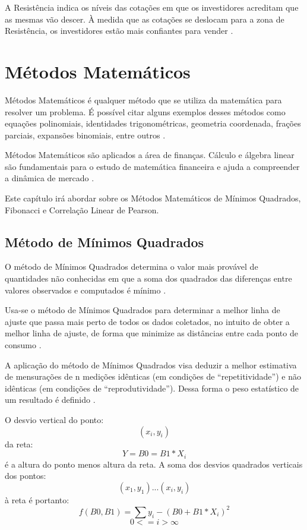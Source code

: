 A Resistência indica os níveis das cotações em que os investidores acreditam que as mesmas vão descer. À medida que as cotações se deslocam para a zona de Resistência, os investidores estão mais confiantes para vender \cite{collins2012}.

\section{Métodos Matemáticos}

Métodos Matemáticos é qualquer método que se utiliza da matemática para resolver um problema. É possível citar alguns exemplos desses métodos como equações polinomiais, identidades trigonométricas, geometria coordenada, frações parciais, expansões binomiais, entre outros \cite{riley2011}.

Métodos Matemáticos são aplicados a área de finanças. Cálculo e álgebra linear são fundamentais para o estudo de matemática financeira e ajuda a compreender a dinâmica de mercado \cite{konis2014}.

Este capítulo irá abordar sobre os Métodos Matemáticos de Mínimos Quadrados, Fibonacci e Correlação Linear de Pearson.

\subsection{Método de Mínimos Quadrados}

O método de Mínimos Quadrados determina o valor mais provável de quantidades não conhecidas em que a soma dos quadrados das diferenças entre valores observados e computados é mínimo \cite[p.~72]{inacio2010}.

Usa-se o método de Mínimos Quadrados para determinar a melhor linha de ajuste que passa mais perto de todos os dados coletados, no intuito de obter a melhor linha de ajuste, de forma que minimize as distâncias entre cada ponto de consumo \cite[p.~46]{dias1985}.

A aplicação do método de Mínimos Quadrados visa deduzir a melhor estimativa de mensurações de n medições idênticas (em condições de “repetitividade”) e não idênticas (em condições de “reprodutividade”). Dessa forma o peso estatístico de um resultado é definido \cite[p.~149]{vuolo1996}.

O desvio vertical do ponto:
\begin{equation}
(x_{i}, y_{i})
\end{equation}
da reta:
\begin{equation}
Y = B0 = B1*X_{i}
\end{equation}
é a altura do ponto menos altura da reta. A soma dos desvios quadrados verticais dos pontos:
\begin{equation}
(x_{1}, y_{1})...(x_{i}, y_{i})
\end{equation}
à reta é portanto:
\begin{equation}
f(B0,B1) = \sum{y_{i} - (B0 + B1 * X_{i})}^2
\end{equation}
\begin{equation}
0 <= i > \infty
\end{equation}

